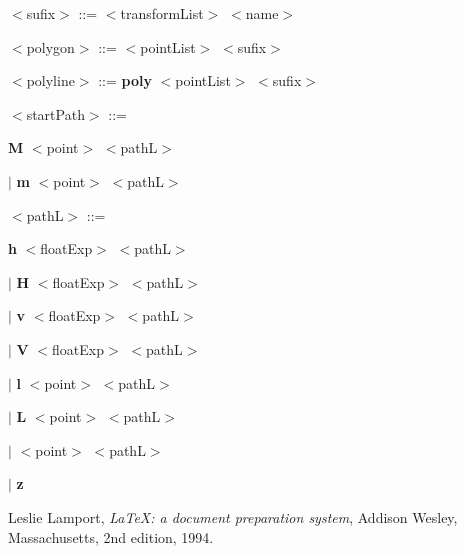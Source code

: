 \documentclass[a4paper,10pt]{article}
\begin{document}
{    \setlength{\leftskip}{0cm}

\medskip
$<$sufix$>$ ::= $<$transformList$>$ $<$name$>$

\medskip
$<$polygon$>$ ::= $<$pointList$>$ $<$sufix$>$

\medskip
$<$polyline$>$ ::= {\bfseries poly} $<$pointList$>$ $<$sufix$>$

\medskip
$<$startPath$>$ ::= 

    \setlength{\leftskip}{0.5cm}
    {\bfseries M} $<$point$>$ $<$pathL$>$

    $|$ {\bfseries m} $<$point$>$ $<$pathL$>$

    \setlength{\leftskip}{0cm}
    
\medskip
$<$pathL$>$ ::= 

    \setlength{\leftskip}{0.5cm}
    
    {\bfseries h} $<$floatExp$>$ $<$pathL$>$

    $|$ {\bfseries H} $<$floatExp$>$ $<$pathL$>$

    $|$ {\bfseries v} $<$floatExp$>$ $<$pathL$>$

    $|$ {\bfseries V} $<$floatExp$>$ $<$pathL$>$

    $|$ {\bfseries l} $<$point$>$ $<$pathL$>$

    $|$ {\bfseries L} $<$point$>$ $<$pathL$>$

    $|$ $<$point$>$ $<$pathL$>$

    $|$ {\bfseries z}

    \setlength{\leftskip}{0cm}

}

\newpage{}
\begin{thebibliography}{9}

    Leslie Lamport,
    \textit{\LaTeX: a document preparation system},
    Addison Wesley, Massachusetts,
    2nd edition,
    1994.
\end{thebibliography}
\end{document}
